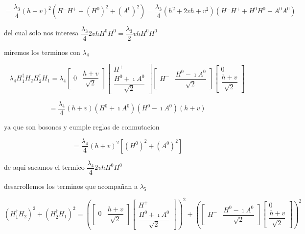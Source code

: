 						$=\dfrac{\lambda_{3}}{4}(h+v)^{2}(H^{-}H^{+}+(H^{0})^{2}+(A^{0})^{2})=\dfrac{\lambda_{3}}{4}(h^{2}+2vh+v^{2})(H^{-}H^{+}+H^{0}H^{0}+A^{0}A^{0})$

del cual solo nos interesa $\dfrac{\lambda_{3}}{4}2vhH^{0}H^{0}=\dfrac{\lambda_{3}}{2}vhH^{0}H^{0}$

miremos los terminos con $\lambda_{4}$

\[
\lambda_{4}H_{1}^{\dagger}H_{2}H_{2}^{\dagger}H_{1}=\lambda_{4}\left[\begin{array}{cc}
0 & \dfrac{h+v}{\sqrt{2}}\end{array}\right]\left[\begin{array}{c}
H^{+}\\
\dfrac{H^{0}+\imath A^{0}}{\sqrt{2}}\end{array}\right]\left[\begin{array}{cc}
H^{-} & \dfrac{H^{0}-\imath A^{0}}{\sqrt{2}}\end{array}\right]\left[\begin{array}{c}
0\\
\dfrac{h+v}{\sqrt{2}}\end{array}\right]\]


\[
=\dfrac{\lambda_{4}}{4}(h+v)(H^{0}+\imath A^{0})(H^{0}-\imath A^{0})(h+v)\]


ya que son bosones y cumple reglas de conmutacion

\[
=\dfrac{\lambda_{4}}{4}(h+v)^{2}\left[(H^{0})^{2}+(A^{0})^{2}\right]\]


de aqui sacamos el termico $\dfrac{\lambda_{4}}{4}2vhH^{0}H^{0}$

desarrollemos los terminos que acompañan a $\lambda_{5}$

\[
\left(H_{1}^{\dagger}H_{2}\right)^{2}+\left(H_{2}^{\dagger}H_{\text{1}}\right)^{2}=\left(\left[\begin{array}{cc}
0 & \dfrac{h+v}{\sqrt{2}}\end{array}\right]\left[\begin{array}{c}
H^{+}\\
\dfrac{H^{0}+\imath A^{0}}{\sqrt{2}}\end{array}\right]\right)^{2}+\left(\left[\begin{array}{cc}
H^{-} & \dfrac{H^{0}-\imath A^{0}}{\sqrt{2}}\end{array}\right]\left[\begin{array}{c}
0\\
\dfrac{h+v}{\sqrt{2}}\end{array}\right]\right)^{2}\]


